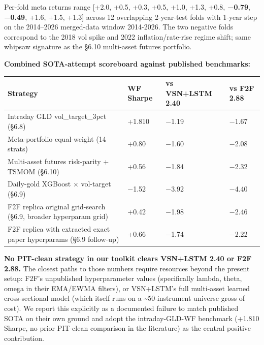 \documentclass[
]{article}
\newcounter{none} %
\begin{document}
Per-fold meta returns range {[}+2.0, +0.5, +0.3, +0.5, +1.0, +1.3, +0.8,
\textbf{−0.79}, \textbf{−0.49}, +1.6, +1.5, +1.3{]} across 12
overlapping 2-year-test folds with 1-year step on the 2014--2026
merged-data window 2014-2026. The two negative folds correspond to the
2018 vol spike and 2022 inflation/rate-rise regime shift; same whipsaw
signature as the §6.10 multi-asset futures portfolio.

\textbf{Combined SOTA-attempt scoreboard against published benchmarks:}

{\def\LTcaptype{none} %
\begin{longtable}[]{@{}
  >{\raggedright\arraybackslash}p{}
  >{\raggedleft\arraybackslash}p{}
  >{\raggedleft\arraybackslash}p{}
  >{\raggedleft\arraybackslash}p{}@{}}
\toprule\noalign{}
\begin{minipage}[b]{\linewidth}\raggedright
Strategy
\end{minipage} & \begin{minipage}[b]{\linewidth}\raggedleft
WF Sharpe
\end{minipage} & \begin{minipage}[b]{\linewidth}\raggedleft
vs VSN+LSTM 2.40
\end{minipage} & \begin{minipage}[b]{\linewidth}\raggedleft
vs F2F 2.88
\end{minipage} \\
\midrule\noalign{}
\endhead
\bottomrule\noalign{}
\endlastfoot
Intraday GLD vol\_target\_3pct (§6.8) & +1.810 & −1.19 & −1.67 \\
Meta-portfolio equal-weight (14 strats) & +0.80 & −1.60 & −2.08 \\
Multi-asset futures risk-parity + TSMOM (§6.10) & +0.56 & −1.84 &
−2.32 \\
Daily-gold XGBoost × vol-target (§6.9) & −1.52 & −3.92 & −4.40 \\
F2F replica original grid-search (§6.9, broader hyperparam grid) & +0.42
& −1.98 & −2.46 \\
F2F replica with extracted exact paper hyperparams (§6.9 follow-up) &
+0.66 & −1.74 & −2.22 \\
\end{longtable}
}

\textbf{No PIT-clean strategy in our toolkit clears VSN+LSTM 2.40 or F2F
2.88.} The closest paths to those numbers require resources beyond the
present setup: F2F's unpublished hyperparameter values (specifically
lambda, theta, omega in their EMA/EWMA filters), or VSN+LSTM's full
multi-asset learned cross-sectional model (which itself runs on a
\textasciitilde50-instrument universe gross of cost). We report this
explicitly as a documented failure to match published SOTA on their own
ground and adopt the intraday-GLD-WF benchmark (+1.810 Sharpe, no prior
PIT-clean comparison in the literature) as the central positive
contribution.
\end{document}
